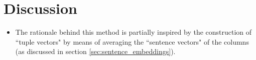 \section{Discussion} 
\begin{itemize}
    \item The rationale behind this method is partially inspired by the construction of ``tuple vectors" by means of averaging the ``sentence vectors" of the columns (as discussed in section \ref{sec:sentence_embeddings}).

\end{itemize}

